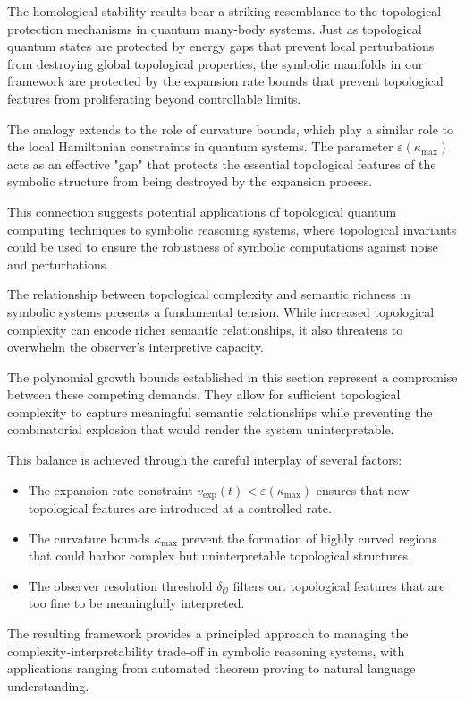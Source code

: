 \begin{remark}
\label{remark:bk4_quantum_topological_phases}
The homological stability results bear a striking resemblance to the topological protection mechanisms in quantum many-body systems. Just as topological quantum states are protected by energy gaps that prevent local perturbations from destroying global topological properties, the symbolic manifolds in our framework are protected by the expansion rate bounds that prevent topological features from proliferating beyond controllable limits.

The analogy extends to the role of curvature bounds, which play a similar role to the local Hamiltonian constraints in quantum systems. The parameter $\varepsilon(\kappa_{\max})$ acts as an effective "gap" that protects the essential topological features of the symbolic structure from being destroyed by the expansion process.

This connection suggests potential applications of topological quantum computing techniques to symbolic reasoning systems, where topological invariants could be used to ensure the robustness of symbolic computations against noise and perturbations.
\end{remark}

\begin{scholium}
\label{scholium:bk4_topological_complexity_semantic_richness}
The relationship between topological complexity and semantic richness in symbolic systems presents a fundamental tension. While increased topological complexity can encode richer semantic relationships, it also threatens to overwhelm the observer's interpretive capacity.

The polynomial growth bounds established in this section represent a compromise between these competing demands. They allow for sufficient topological complexity to capture meaningful semantic relationships while preventing the combinatorial explosion that would render the system uninterpretable.

This balance is achieved through the careful interplay of several factors:
\begin{itemize}
\item The expansion rate constraint $v_{\text{exp}}(t) < \varepsilon(\kappa_{\max})$ ensures that new topological features are introduced at a controlled rate.
\item The curvature bounds $\kappa_{\max}$ prevent the formation of highly curved regions that could harbor complex but uninterpretable topological structures.
\item The observer resolution threshold $\delta_{\mathcal{O}}$ filters out topological features that are too fine to be meaningfully interpreted.
\end{itemize}

The resulting framework provides a principled approach to managing the complexity-interpretability trade-off in symbolic reasoning systems, with applications ranging from automated theorem proving to natural language understanding.
\end{scholium}

